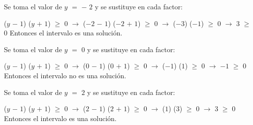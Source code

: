 \documentclass[12pt]{article}
\newenvironment{MyColorPar}[1]{%
    \leavevmode\color{#1}\ignorespaces%
}{%
}%
\begin{document}
\begin{MyColorPar}{Cinnabar}
{{\black{Intervalo I. ($-\infty$, $-$ $1$]}} \vspace{0.5cm}

Se toma el valor de $y$ $=$ $-$ $2$ y se sustituye en cada factor: \vspace{0.5cm}

($y$ $-$ $1$) ($y$ $+$ $1$) $\geq$ $0$ \hspace{0.1cm} $\longrightarrow$ \hspace{0.1cm} ($-2$ $-$ $1$) ($-2$ $+$ $1$) $\geq$ $0$ \hspace{0.1cm} $\longrightarrow$ \hspace{0.1cm} ($-3$) ($-1$) $\geq$ $0$ \hspace{0.1cm} $\longrightarrow$ \hspace{0.1cm} $3$ $\geq$ $0$ \hspace{0.1cm} {} Entonces el intervalo {\black{($-\infty$, $-$ $1$]}} es una solución. \vspace{0.5cm}

{} \vspace{0.5cm}

Se toma el valor de $y$ $=$ $0$ y se sustituye en cada factor: \vspace{0.5cm}

($y$ $-$ $1$) ($y$ $+$ $1$) $\geq$ $0$ \hspace{0.1cm} $\longrightarrow$ \hspace{0.1cm} ($0$ $-$ $1$) ($0$ $+$ $1$) $\geq$ $0$ \hspace{0.1cm} $\longrightarrow$ \hspace{0.1cm} ($-1$) ($1$) $\geq$ $0$ \hspace{0.1cm} $\longrightarrow$ \hspace{0.1cm} $-1$ $\geq$ $0$ \hspace{0.1cm} {} Entonces el intervalo {\black{[$-$ $1$, $1$]}} no es una solución. \vspace{0.5cm}

{} \vspace{0.5cm}

Se toma el valor de $y$ $=$ $2$ y se sustituye en cada factor: \vspace{0.5cm}

($y$ $-$ $1$) ($y$ $+$ $1$) $\geq$ $0$ \hspace{0.1cm} $\longrightarrow$ \hspace{0.1cm} ($2$ $-$ $1$) ($2$ $+$ $1$) $\geq$ $0$ \hspace{0.1cm} $\longrightarrow$ \hspace{0.1cm} ($1$) ($3$) $\geq$ $0$ \hspace{0.1cm} $\longrightarrow$ \hspace{0.1cm} $3$ $\geq$ $0$ \hspace{0.1cm} {} Entonces el intervalo {\black{[$1$, $\infty$]}} es una solución. \vspace{0.5cm}

}
\end{MyColorPar}
\end{document}
